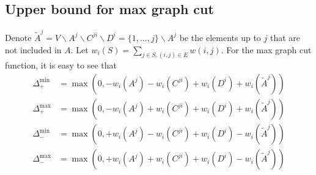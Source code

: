 \subsection{Upper bound for max graph cut}
Denote $\tilde{A}^j = V\backslash A^j\backslash C^{ji}\backslash D^i = \{1,\dots,j\}\backslash A^j$ be the elements up to $j$ that are not included in $A$.
Let $w_i(S) = \sum_{j\in S, (i,j)\in E} w(i,j)$.
For the max graph cut function, it is easy to see that 
\begin{align*}
\Delta_+^{\min} &= \max(0, - w_i(A^j) -w_i(C^{ji}) + w_i(D^i) + w_i(\tilde{A}^j))\\
\Delta_+^{\max} &= \max(0, - w_i(A^j) + w_i(C^{ji}) + w_i(D^i) + w_i(\tilde{A}^j))\\
\Delta_-^{\min} &= \max(0, + w_i(A^j) - w_i(C^{ji}) + w_i(D^i) - w_i(\tilde{A}^j))\\
\Delta_-^{\max} &= \max(0, + w_i(A^j) + w_i(C^{ji}) + w_i(D^i) - w_i(\tilde{A}^j))
\end{align*}

